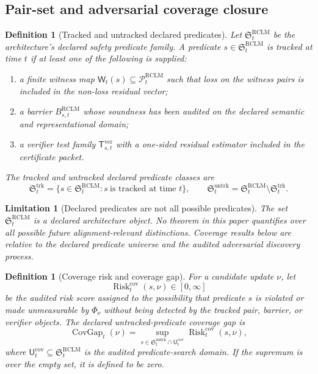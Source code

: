 \documentclass[11pt,a4paper]{article}
\newtheorem{definition}[theorem]{Definition}
\newtheorem{limitation}[theorem]{Limitation}
\newcommand{\Pcal}{\mathcal P}
\newcommand{\RCLM}{\mathrm{RCLM}}
\newcommand{\Risk}{\operatorname{Risk}}
\newcommand{\ver}{\mathrm{ver}}
\newcommand{\cov}{\mathrm{cov}}
\newcommand{\trk}{\mathrm{trk}}
\newcommand{\untrk}{\mathrm{untrk}}
\begin{document}
\subsection{Pair-set and adversarial coverage closure}

\begin{definition}[Tracked and untracked declared predicates]
\label{def:tracked-untracked-predicates}
Let \(\mathfrak S_t^{\RCLM}\) be the architecture's declared safety predicate family. A predicate \(s\in\mathfrak S_t^{\RCLM}\) is \emph{tracked} at time \(t\) if at least one of the following is supplied:
\begin{enumerate}[label=(\alph*),leftmargin=1.5em]
    \item a finite witness map \(\mathsf W_t(s)\subseteq\Pcal_t^{\RCLM}\) such that loss on the witness pairs is included in the non-loss residual vector;
    \item a barrier \(B_{s,t}^{\RCLM}\) whose soundness has been audited on the declared semantic and representational domain;
    \item a verifier test family \(\mathsf T_{s,t}^{\ver}\) with a one-sided residual estimator included in the certificate packet.
\end{enumerate}
The tracked and untracked declared predicate classes are
\[
\mathfrak S_t^{\trk}=
\{s\in\mathfrak S_t^{\RCLM}:s\ \text{is tracked at time }t\},
\qquad
\mathfrak S_t^{\untrk}=\mathfrak S_t^{\RCLM}\setminus\mathfrak S_t^{\trk}.
\]
\end{definition}

\begin{limitation}[Declared predicates are not all possible predicates]
\label{lim:declared-not-all-predicates}
The set \(\mathfrak S_t^{\RCLM}\) is a declared architecture object. No theorem in this paper quantifies over all possible future alignment-relevant distinctions. Coverage results below are relative to the declared predicate universe and the audited adversarial discovery process.
\end{limitation}

\begin{definition}[Coverage risk and coverage gap]
\label{def:coverage-gap}
For a candidate update \(\nu\), let
\[
\Risk_t^{\cov}(s,\nu)\in[0,\infty]
\]
be the audited risk score assigned to the possibility that predicate \(s\) is violated or made unmeasurable by \(\Phi_\nu\) without being detected by the tracked pair, barrier, or verifier objects. The declared untracked-predicate coverage gap is
\[
\operatorname{CovGap}_t(\nu)
=
\sup_{s\in\mathfrak S_t^{\untrk}\cap\mathsf U_t^{\cov}}
\Risk_t^{\cov}(s,\nu),
\]
where \(\mathsf U_t^{\cov}\subseteq\mathfrak S_t^{\RCLM}\) is the audited predicate-search domain. If the supremum is over the empty set, it is defined to be zero.
\end{definition}
\end{document}
